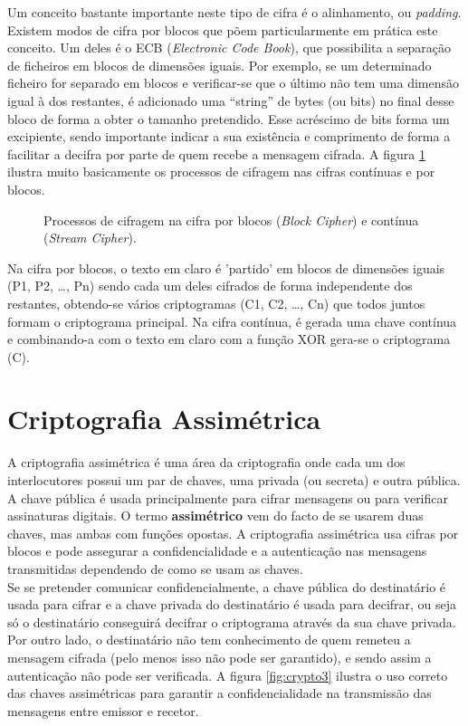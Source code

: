 \documentclass[a4paper,11pt,openright,oneside]{report}
\begin{document}
Um conceito bastante importante neste tipo de cifra é o alinhamento, ou \textit{padding}. Existem modos de cifra por blocos que põem particularmente em prática este conceito. Um deles é o ECB (\textit{Electronic Code Book}), que possibilita a separação de ficheiros em blocos de dimensões iguais. Por exemplo, se um determinado ficheiro for separado em blocos e verificar-se que o último não tem uma dimensão igual à dos restantes, é adicionado uma “string” de bytes (ou bits) no final desse bloco de forma a obter o tamanho pretendido. Esse acréscimo de bits forma um excipiente, sendo importante indicar a sua existência e comprimento de forma a facilitar a decifra por parte de quem recebe a mensagem cifrada. A figura \ref{fig:crypto2} ilustra muito basicamente os processos de cifragem nas cifras contínuas e por blocos.

\begin{figure}[ht]
\center
{}
\caption{Processos de cifragem na cifra por blocos (\textit{Block Cipher}) e contínua (\textit{Stream Cipher}).}
\label{fig:crypto2}
\end{figure}

Na cifra por blocos, o texto em claro é 'partido' em blocos de dimensões iguais (P1, P2, …, Pn) sendo cada um deles cifrados de forma independente dos restantes, obtendo-se vários criptogramas (C1, C2, …, Cn) que todos juntos formam o criptograma principal. Na cifra contínua, é gerada uma chave contínua e combinando-a com o texto em claro com a função XOR gera-se o criptograma (C).

\section{Criptografia Assimétrica}
\label{chap.assimétrica}

A criptografia assimétrica é uma área da criptografia onde cada um dos interlocutores possui um par de chaves, uma privada (ou secreta) e outra pública. A chave pública é usada principalmente para cifrar mensagens ou para verificar assinaturas digitais. O termo \textbf{assimétrico} vem do facto de se usarem duas chaves, mas ambas com funções opostas. A criptografia assimétrica usa cifras por blocos e pode assegurar a confidencialidade e a autenticação nas mensagens transmitidas dependendo de como se usam as chaves.\\

Se se pretender comunicar confidencialmente, a chave pública do destinatário é usada para cifrar e a chave privada do destinatário é usada para decifrar, ou seja só o destinatário conseguirá decifrar o criptograma através da sua chave privada. Por outro lado, o destinatário não tem conhecimento de quem remeteu a mensagem cifrada (pelo menos isso não pode ser garantido), e sendo assim a autenticação não pode ser verificada. A figura \ref{fig:crypto3} ilustra o uso correto das chaves assimétricas para garantir a confidencialidade na transmissão das mensagens entre emissor e recetor.
\end{document}
